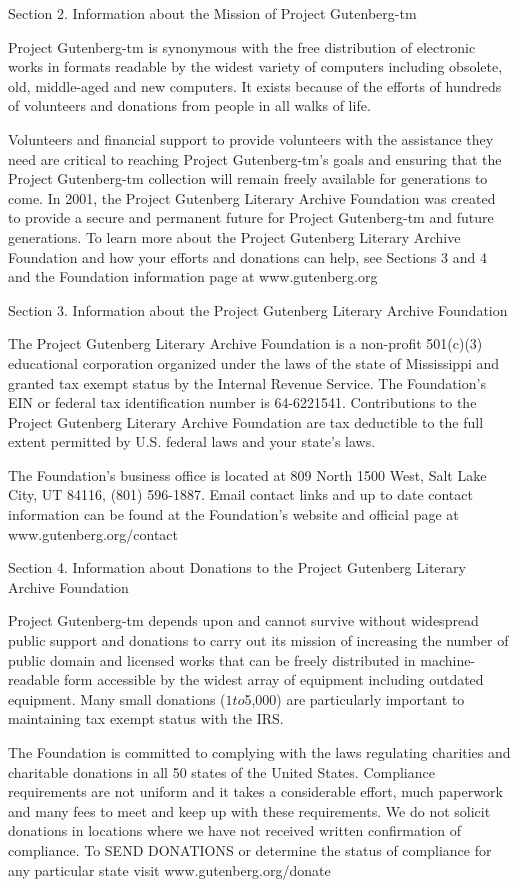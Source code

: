 \documentclass[oneside]{book}
\begin{document}
Section 2. Information about the Mission of Project Gutenberg-tm

Project Gutenberg-tm is synonymous with the free distribution of
electronic works in formats readable by the widest variety of
computers including obsolete, old, middle-aged and new computers. It
exists because of the efforts of hundreds of volunteers and donations
from people in all walks of life.

Volunteers and financial support to provide volunteers with the
assistance they need are critical to reaching Project Gutenberg-tm's
goals and ensuring that the Project Gutenberg-tm collection will
remain freely available for generations to come. In 2001, the Project
Gutenberg Literary Archive Foundation was created to provide a secure
and permanent future for Project Gutenberg-tm and future
generations. To learn more about the Project Gutenberg Literary
Archive Foundation and how your efforts and donations can help, see
Sections 3 and 4 and the Foundation information page at
www.gutenberg.org

Section 3. Information about the Project Gutenberg Literary
Archive Foundation

The Project Gutenberg Literary Archive Foundation is a non-profit
501(c)(3) educational corporation organized under the laws of the
state of Mississippi and granted tax exempt status by the Internal
Revenue Service. The Foundation's EIN or federal tax identification
number is 64-6221541. Contributions to the Project Gutenberg Literary
Archive Foundation are tax deductible to the full extent permitted by
U.S. federal laws and your state's laws.

The Foundation's business office is located at 809 North 1500 West,
Salt Lake City, UT 84116, (801) 596-1887. Email contact links and up
to date contact information can be found at the Foundation's website
and official page at www.gutenberg.org/contact

Section 4. Information about Donations to the Project Gutenberg
Literary Archive Foundation

Project Gutenberg-tm depends upon and cannot survive without
widespread public support and donations to carry out its mission of
increasing the number of public domain and licensed works that can be
freely distributed in machine-readable form accessible by the widest
array of equipment including outdated equipment. Many small donations
($1 to $5,000) are particularly important to maintaining tax exempt
status with the IRS.

The Foundation is committed to complying with the laws regulating
charities and charitable donations in all 50 states of the United
States. Compliance requirements are not uniform and it takes a
considerable effort, much paperwork and many fees to meet and keep up
with these requirements. We do not solicit donations in locations
where we have not received written confirmation of compliance. To SEND
DONATIONS or determine the status of compliance for any particular
state visit www.gutenberg.org/donate
\end{document}
